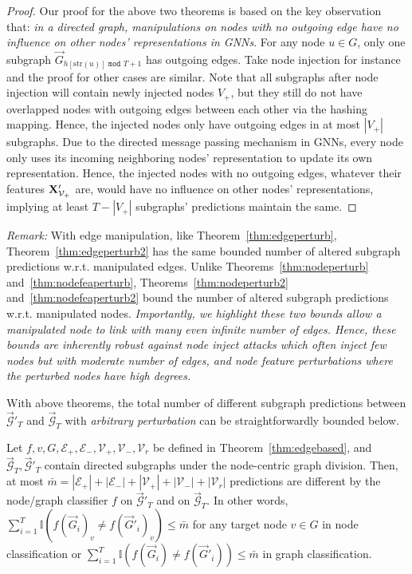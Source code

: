 \begin{proof}
Our proof for the above two theorems is based on the key observation that: \emph{in a directed graph, manipulations on nodes with no outgoing edge have no influence on other nodes' representations in GNNs}. For any node  $u \in G$, only one subgraph $\vec{G}_{h[\mathrm{str}(u)] \, \, \texttt{mod} \, \, T+1}$ has outgoing edges.
Take node injection for instance and the proof for other cases are similar. Note that all subgraphs after node injection will contain newly injected nodes $V_{+}$, but they still do not have overlapped nodes with outgoing edges between each other via the hashing mapping. Hence, the injected nodes only have outgoing edges in at most $|V_{+}|$ subgraphs. 
Due to the directed message passing mechanism in GNNs, every node only uses its incoming neighboring nodes' representation to update its own representation. Hence, 
the injected nodes with no outgoing edges, whatever their features ${\bf X}'_{\mathcal{V}_+}$ are, would have no influence on other nodes' representations, implying at least $T-|V_{+}|$ subgraphs' predictions maintain the same.
\vspace{-2mm}
\end{proof}

\noindent \emph{Remark:} 
With edge manipulation, like Theorem~\ref{thm:edgeperturb}, Theorem~\ref{thm:edgeperturb2} has the same bounded number of altered subgraph predictions w.r.t. manipulated edges. 
Unlike Theorems~\ref{thm:nodeperturb} and~\ref{thm:nodefeaperturb}, Theorems~\ref{thm:nodeperturb2} and~\ref{thm:nodefeaperturb2} bound the number of altered subgraph predictions w.r.t. manipulated nodes. \emph{Importantly, we highlight these two bounds allow a manipulated node to link with many even infinite number of edges. Hence, these bounds are inherently robust against node inject attacks which often inject few nodes but with moderate number of edges, and node feature perturbations where the perturbed nodes have high degrees.} 


With above  theorems, the total number of different subgraph predictions between  $\vec{\mathcal{G}}'_T$ and $\vec{\mathcal{G}}_T$ with \emph{arbitrary perturbation} can be straightforwardly bounded below.  

\begin{theorem}
\label{thm:nodebased}
Let $f, v, G, \mathcal{E}_+, \mathcal{E}_-, {\mathcal{V}_+}, {\mathcal{V}_-}, \mathcal{V}_{r}$ be defined in Theorem~\ref{thm:edgebased}, and $\vec{\mathcal{G}}_T, \vec{\mathcal{G}}'_T$ contain directed subgraphs under the node-centric graph division.  
Then, at most $\bar{m} = |\mathcal{E}_+|+|\mathcal{E}_-| + |{\mathcal{V}_+}| + |{\mathcal{V}_-}| + |{\mathcal{V}_r}|$ predictions are different by the node/graph classifier $f$ on $\vec{\mathcal{G}}'_T$ and on $\vec{\mathcal{G}}_T$.   
In other words, $\sum_{i=1}^{T}\mathbb{I}(f(\vec{G}_{i})_v\neq f(\vec{G}'_{i})_v) \leq \bar{m}$ for any target node $v \in G$ in node classification or $\sum_{i=1}^{T}\mathbb{I}(f(\vec{G}_{i})\neq f(\vec{G}'_{i})) \leq \bar{m}$ in graph classification. 
\end{theorem}

